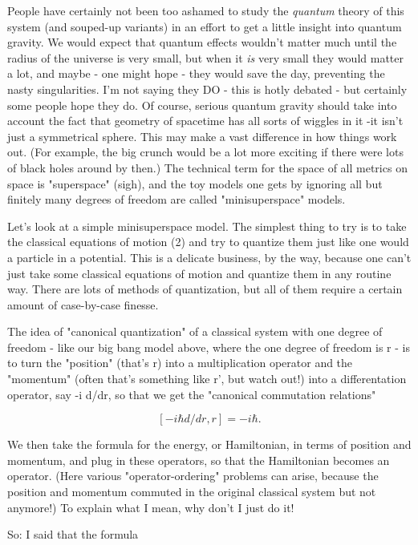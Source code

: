 People have certainly not been too ashamed to study the \emph{quantum}
theory of this system (and souped-up variants) in an effort to get a
little insight into quantum gravity.  We would expect that quantum
effects wouldn't matter much until the radius of the universe is very
small, but when it \emph{is} very small they would matter a lot, and maybe -
one might hope - they would save the day, preventing the nasty
singularities.  I'm not saying they DO - this is hotly debated - but
certainly some people hope they do.  Of course, serious quantum gravity
should take into account the fact that geometry of spacetime has all
sorts of wiggles in it -it isn't just a symmetrical sphere.  This may make
a vast difference in how things work out.  (For example, the big crunch
would be a lot more exciting if there were lots of black holes around by
then.)   The technical term for the space of all metrics on space is
"superspace" (sigh), and the toy models one gets by ignoring all but
finitely many degrees of freedom are called "minisuperspace" models. 

Let's look at a simple minisuperspace model.  The simplest thing
to try is to take the classical equations of motion (2) and try to
quantize them just like one would a particle in a potential.  This is a
delicate business, by the way, because one can't just take some
classical equations of motion and quantize them in any routine way.  
There are lots of methods of quantization, but all of them require a
certain amount of case-by-case finesse.

The idea of "canonical quantization" of a classical system with one
degree of freedom - like our big bang model above, where the one degree
of freedom is r  - is to turn the "position" (that's r) into a
multiplication operator and the "momentum" (often that's something like
r', but watch out!) into a differentation operator, say -i \hbar  d/dr, so that
we get the "canonical commutation relations" 


$$

			[-i \hbar  d/dr, r] = -i \hbar .
$$
    

We then take the formula for the energy, or Hamiltonian, in terms of
position and momentum, and plug in these operators, so that the
Hamiltonian becomes an operator.  (Here various "operator-ordering"
problems can arise, because the position and momentum commuted in the
original classical system but not anymore!)   To explain what I mean,
why don't I just do it!

So: I said that the formula 



